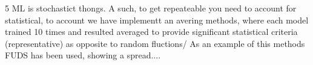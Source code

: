5 ML is stochastict thongs. A such, to get repeateable you need to account for statistical, to account we have implementt an avering methods, where each model trained 10 times and resulted averaged to provide significant statistical criteria (representative) as opposite to random fluctions/
As an example of this methods FUDS has been used, showing a spread....

